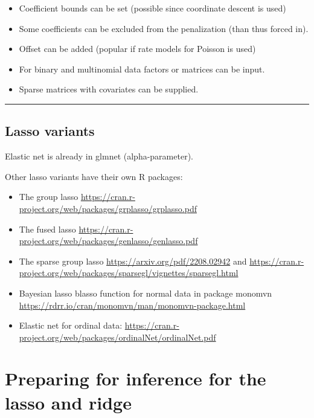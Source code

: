 \documentclass[
  letterpaper,
  DIV=11,
  numbers=noendperiod]{scrartcl}
\providecommand{\tightlist}{%
  \setlength{\itemsep}{0pt}\setlength{\parskip}{0pt}}\usepackage{longtable,booktabs,array}
\begin{document}
\begin{itemize}
\tightlist
\item
  Coefficient bounds can be set (possible since coordinate descent is
  used)
\item
  Some coefficients can be excluded from the penalization (than thus
  forced in).
\item
  Offset can be added (popular if rate models for Poisson is used)
\item
  For binary and multinomial data factors or matrices can be input.
\item
  Sparse matrices with covariates can be supplied.
\end{itemize}

\begin{center}\rule{0.5\linewidth}{0.5pt}\end{center}

\hypertarget{lasso-variants}{%
\subsection{Lasso variants}\label{lasso-variants}}

Elastic net is already in glmnet (alpha-parameter).

Other lasso variants have their own R packages:

\begin{itemize}
\item
  The group lasso
  \url{https://cran.r-project.org/web/packages/grplasso/grplasso.pdf}
\item
  The fused lasso
  \url{https://cran.r-project.org/web/packages/genlasso/genlasso.pdf}
\item
  The sparse group lasso \url{https://arxiv.org/pdf/2208.02942} and
  \url{https://cran.r-project.org/web/packages/sparsegl/vignettes/sparsegl.html}
\item
  Bayesian lasso blasso function for normal data in package monomvn
  \url{https://rdrr.io/cran/monomvn/man/monomvn-package.html}
\item
  Elastic net for ordinal data:
  \url{https://cran.r-project.org/web/packages/ordinalNet/ordinalNet.pdf}
\end{itemize}

\hypertarget{preparing-for-inference-for-the-lasso-and-ridge}{%
\section{Preparing for inference for the lasso and
ridge}\label{preparing-for-inference-for-the-lasso-and-ridge}}
\end{document}
